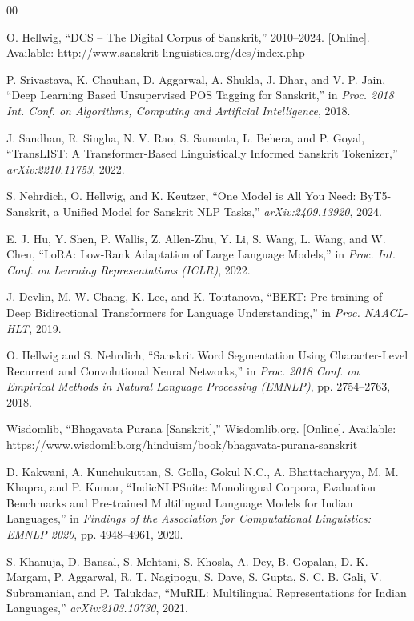 \documentclass[conference]{IEEEtran}
\begin{document}
\begin{thebibliography}{00}

 O. Hellwig, ``DCS -- The Digital Corpus of Sanskrit,'' 2010--2024. [Online]. Available: http://www.sanskrit-linguistics.org/dcs/index.php

 P. Srivastava, K. Chauhan, D. Aggarwal, A. Shukla, J. Dhar, and V. P. Jain, ``Deep Learning Based Unsupervised POS Tagging for Sanskrit,'' in \textit{Proc. 2018 Int. Conf. on Algorithms, Computing and Artificial Intelligence}, 2018.

 J. Sandhan, R. Singha, N. V. Rao, S. Samanta, L. Behera, and P. Goyal, ``TransLIST: A Transformer-Based Linguistically Informed Sanskrit Tokenizer,'' \textit{arXiv:2210.11753}, 2022.

 S. Nehrdich, O. Hellwig, and K. Keutzer, ``One Model is All You Need: ByT5-Sanskrit, a Unified Model for Sanskrit NLP Tasks,'' \textit{arXiv:2409.13920}, 2024.

 E. J. Hu, Y. Shen, P. Wallis, Z. Allen-Zhu, Y. Li, S. Wang, L. Wang, and W. Chen, ``LoRA: Low-Rank Adaptation of Large Language Models,'' in \textit{Proc. Int. Conf. on Learning Representations (ICLR)}, 2022.

 J. Devlin, M.-W. Chang, K. Lee, and K. Toutanova, ``BERT: Pre-training of Deep Bidirectional Transformers for Language Understanding,'' in \textit{Proc. NAACL-HLT}, 2019.

 O. Hellwig and S. Nehrdich, ``Sanskrit Word Segmentation Using Character-Level Recurrent and Convolutional Neural Networks,'' in \textit{Proc. 2018 Conf. on Empirical Methods in Natural Language Processing (EMNLP)}, pp. 2754--2763, 2018.

 Wisdomlib, ``Bhagavata Purana [Sanskrit],'' Wisdomlib.org. [Online]. Available: https://www.wisdomlib.org/hinduism/book/bhagavata-purana-sanskrit

 D. Kakwani, A. Kunchukuttan, S. Golla, Gokul N.C., A. Bhattacharyya, M. M. Khapra, and P. Kumar, ``IndicNLPSuite: Monolingual Corpora, Evaluation Benchmarks and Pre-trained Multilingual Language Models for Indian Languages,'' in \textit{Findings of the Association for Computational Linguistics: EMNLP 2020}, pp. 4948--4961, 2020.

 S. Khanuja, D. Bansal, S. Mehtani, S. Khosla, A. Dey, B. Gopalan, D. K. Margam, P. Aggarwal, R. T. Nagipogu, S. Dave, S. Gupta, S. C. B. Gali, V. Subramanian, and P. Talukdar, ``MuRIL: Multilingual Representations for Indian Languages,'' \textit{arXiv:2103.10730}, 2021.


\end{thebibliography}
\end{document}
